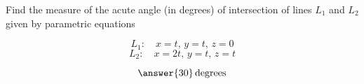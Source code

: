 \documentclass{ximera}
\author{}
\begin{document}
\begin{exercise}
Find the measure of the acute angle (in degrees) of intersection of lines $L_1$ and $L_2$ given by parametric equations

$$L_1:\quad x=t,\,y=t,\,z=0$$
$$L_2:\quad x=2t,\,y=t,\,z=t$$

$$\answer{30}\, \mbox{degrees}$$
 
\end{exercise}
\end{document}
